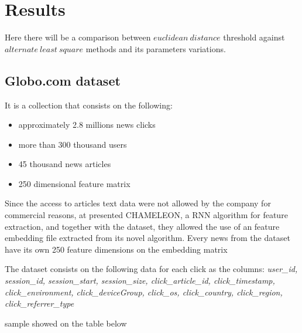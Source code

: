 \documentclass[ecp,tc,english]{iiufrgs}
\begin{document}

\chapter{Results}

    Here there will be a comparison between \(euclidean\ distance\) threshold against \(alternate\ least\ square\) methods and its parameters variations.

    \section{Globo.com dataset} %
    It is a collection that consists on the following:
    \begin{itemize}
        \item approximately 2.8 millions news clicks
        \item more than 300 thousand users
        \item 45 thousand news articles
        \item 250 dimensional feature matrix
    \end{itemize}
    
    Since the access to articles text data were not allowed by the company for commercial reasons, at \cite{deSouzaPereiraMoreira:2018:CDL:3240323.3240331} presented CHAMELEON, a RNN algorithm for feature extraction, and together with the dataset, they allowed the use of an feature embedding file extracted from its novel algorithm. Every news from the dataset have its own 250 feature dimensions on the embedding matrix
    
    The dataset consists on the following data for each click as the columns:
    \newline \textit{user\_id, session\_id, session\_start, session\_size, click\_article\_id, click\_timestamp,}
    \newline \textit{click\_environment, click\_deviceGroup, click\_os, click\_country, click\_region,}
    \newline \textit{click\_referrer\_type} 

    sample showed on the table below
    
\end{document}
